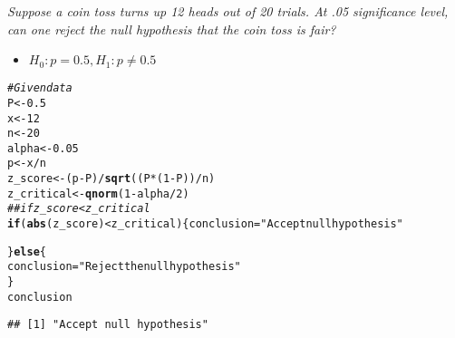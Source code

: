 \documentclass{article}\usepackage[]{graphicx}\usepackage[]{xcolor}
\makeatletter
\newcommand{\hlnum}[1]{\textcolor[rgb]{0.686,0.059,0.569}{#1}}%
\newcommand{\hlsng}[1]{\textcolor[rgb]{0.192,0.494,0.8}{#1}}%
\newcommand{\hlcom}[1]{\textcolor[rgb]{0.678,0.584,0.686}{\textit{#1}}}%
\newcommand{\hlopt}[1]{\textcolor[rgb]{0,0,0}{#1}}%
\newcommand{\hldef}[1]{\textcolor[rgb]{0.345,0.345,0.345}{#1}}%
\newcommand{\hlkwa}[1]{\textcolor[rgb]{0.161,0.373,0.58}{\textbf{#1}}}%
\newcommand{\hlkwb}[1]{\textcolor[rgb]{0.69,0.353,0.396}{#1}}%
\newcommand{\hlkwd}[1]{\textcolor[rgb]{0.737,0.353,0.396}{\textbf{#1}}}%
\newenvironment{kframe}{%
 \def\at@end@of@kframe{}%
 \ifinner\ifhmode%
  \def\at@end@of@kframe{\end{minipage}}%
  \begin{minipage}{\columnwidth}%
 \fi\fi%
 \def\FrameCommand##1{\hskip\@totalleftmargin \hskip-\fboxsep
 \colorbox{shadecolor}{##1}\hskip-\fboxsep
     \hskip-\linewidth \hskip-\@totalleftmargin \hskip\columnwidth}%
 \MakeFramed {\advance\hsize-\width
   \@totalleftmargin\z@ \linewidth\hsize
   \@setminipage}}%
 {\par\unskip\endMakeFramed%
 \at@end@of@kframe}
\newenvironment{knitrout}{}{} %
\makeatother
\begin{document}
\emph{Suppose a coin toss turns up 12 heads out of 20 trials. At .05 significance level,
can one reject the null hypothesis that the coin toss is fair?}\\
\begin{itemize}
  \item $H_0:p=0.5, H_1: p\neq 0.5$
\end{itemize}
\begin{knitrout}
\color{fgcolor}\begin{kframe}
\begin{alltt}
\hlcom{# Given data}
\hldef{P} \hlkwb{<-} \hlnum{0.5}
\hldef{x} \hlkwb{<-} \hlnum{12}
\hldef{n} \hlkwb{<-} \hlnum{20}
\hldef{alpha} \hlkwb{<-} \hlnum{0.05}
\hldef{p} \hlkwb{<-} \hldef{x} \hlopt{/} \hldef{n}
\hldef{z_score} \hlkwb{<-} \hldef{(p} \hlopt{-} \hldef{P)} \hlopt{/} \hlkwd{sqrt}\hldef{((P} \hlopt{*} \hldef{(}\hlnum{1} \hlopt{-} \hldef{P))} \hlopt{/} \hldef{n)}
\hldef{z_critical} \hlkwb{<-} \hlkwd{qnorm}\hldef{(}\hlnum{1} \hlopt{-} \hldef{alpha} \hlopt{/} \hlnum{2}\hldef{)}
\hlcom{## if z_score < z_critical}
\hlkwa{if} \hldef{(}\hlkwd{abs}\hldef{(z_score)} \hlopt{<} \hldef{z_critical) \{conclusion}\hlkwb{=}\hlsng{"Accept null hypothesis"}

\hldef{\}} \hlkwa{else} \hldef{\{}
  \hldef{conclusion} \hlkwb{=} \hlsng{"Reject the null hypothesis"}
\hldef{\}}
\hldef{conclusion}
\end{alltt}
\begin{verbatim}
## [1] "Accept null hypothesis"
\end{verbatim}
\end{kframe}
\end{knitrout}
\end{document}
